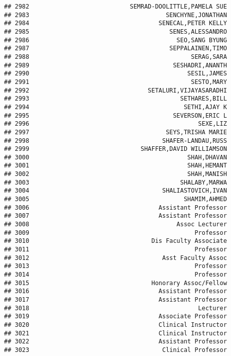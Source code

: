 \documentclass[
]{article}
\begin{document}
\begin{verbatim}
## 2982                            SEMRAD-DOOLITTLE,PAMELA SUE
## 2983                                      SENCHYNE,JONATHAN
## 2984                                    SENECAL,PETER KELLY
## 2985                                       SENES,ALESSANDRO
## 2986                                         SEO,SANG BYUNG
## 2987                                       SEPPALAINEN,TIMO
## 2988                                             SERAG,SARA
## 2989                                        SESHADRI,ANANTH
## 2990                                            SESIL,JAMES
## 2991                                             SESTO,MARY
## 2992                                 SETALURI,VIJAYASARADHI
## 2993                                          SETHARES,BILL
## 2994                                           SETHI,AJAY K
## 2995                                        SEVERSON,ERIC L
## 2996                                               SEXE,LIZ
## 2997                                      SEYS,TRISHA MARIE
## 2998                                     SHAFER-LANDAU,RUSS
## 2999                               SHAFFER,DAVID WILLIAMSON
## 3000                                            SHAH,DHAVAN
## 3001                                            SHAH,HEMANT
## 3002                                            SHAH,MANISH
## 3003                                          SHALABY,MARWA
## 3004                                     SHALIASTOVICH,IVAN
## 3005                                           SHAMIM,AHMED
## 3006                                    Assistant Professor
## 3007                                    Assistant Professor
## 3008                                         Assoc Lecturer
## 3009                                              Professor
## 3010                                  Dis Faculty Associate
## 3011                                              Professor
## 3012                                     Asst Faculty Assoc
## 3013                                              Professor
## 3014                                              Professor
## 3015                                  Honorary Assoc/Fellow
## 3016                                    Assistant Professor
## 3017                                    Assistant Professor
## 3018                                               Lecturer
## 3019                                    Associate Professor
## 3020                                    Clinical Instructor
## 3021                                    Clinical Instructor
## 3022                                    Assistant Professor
## 3023                                     Clinical Professor

\end{verbatim}
\end{document}
